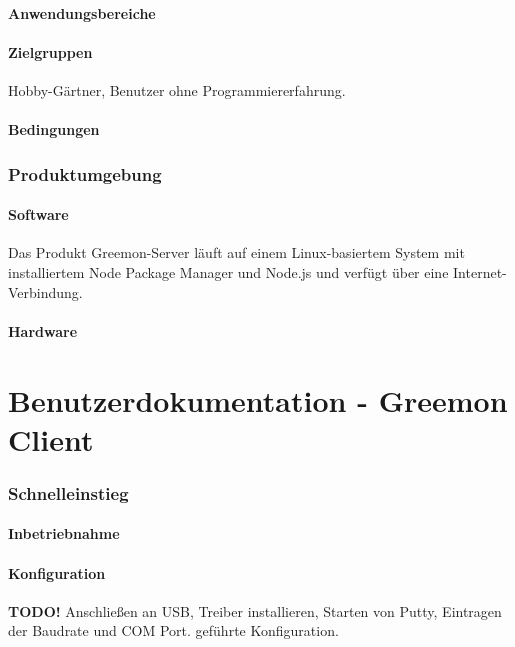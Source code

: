 \documentclass[pointlessnumbers]{scrartcl}
\begin{document}
\subsection{Anwendungsbereiche}
%
%
\subsection{Zielgruppen}
    Hobby-Gärtner, Benutzer ohne Programmiererfahrung. 
\subsection{Bedingungen}
%
%

\section{Produktumgebung}
\subsection{Software}
 Das Produkt Greemon-Server läuft auf einem Linux-basiertem System mit installiertem Node Package Manager und Node.js und verfügt über eine Internet-Verbindung.

\subsection{Hardware}
%
%






\newpage
\part{Benutzerdokumentation - Greemon Client}
\section{Schnelleinstieg}
    \subsection{Inbetriebnahme}
    \subsection{Konfiguration}
    \textbf{TODO!}
    Anschließen an USB, Treiber installieren, Starten von Putty, Eintragen der Baudrate und COM Port. geführte Konfiguration.
\end{document}
